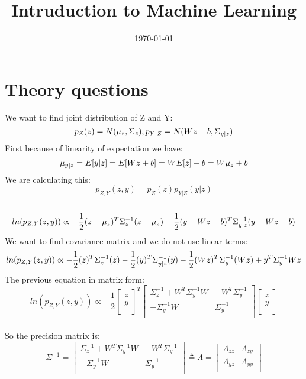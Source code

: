 \documentclass[12pt]{article}
\title{Intruduction to Machine Learning}
\date{\today}
\begin{document}
\maketitlepage
\maketitlestart
\section{Theory questions}
\begin{qsolve}[Question 1]
	We want to find joint distribution of Z and Y:\\
	$$p_Z(z)=N(\mu_z,\Sigma_z),p_{Y|Z}=N(Wz+b,\Sigma_{y|z})\\$$
	First because of linearity of expectation we have:\\
	$$\mu_{y|z}=E[y|z]=E[Wz+b]=WE[z]+b=W\mu_z+b\\$$
	We are calculating this:\\
	$$p_{Z,Y}(z,y)=p_Z(z)p_{Y|Z}(y|z)$$\\
	$$ln(p_{Z,Y}(z,y))\propto-\frac{1}{2}(z-\mu_z)^T\Sigma_z^{-1}(z-\mu_z)-\frac{1}{2}(y-Wz-b)^T\Sigma_{y|z}^{-1}(y-Wz-b)\\$$
	We want to find covariance matrix and we do not use linear terms:\\
	$$ln(p_{Z,Y}(z,y))\propto-\frac{1}{2}(z)^T\Sigma_z^{-1}(z)-\frac{1}{2}(y)^T\Sigma_{y|z}^{-1}(y)-\frac{1}{2}(Wz)^T\Sigma_y^{-1}(Wz)+y^T\Sigma_y^{-1}Wz\\$$
	The previous equation in matrix form:\\
	$$ln(p_{Z,Y}(z,y))\propto-\frac{1}{2} \begin{bmatrix} z  \\y \\\end{bmatrix}^T\begin{bmatrix} \Sigma_z^{-1}+W^T\Sigma_y^{-1}W & -W^T\Sigma_y^{-1} \\-\Sigma_y^{-1}W & \Sigma_y^{-1} \\\end{bmatrix} \begin{bmatrix} z  \\y \\\end{bmatrix}$$\\
	So the precision matrix is:\\
	$$\Sigma^{-1}=\begin{bmatrix} \Sigma_z^{-1}+W^T\Sigma_y^{-1}W & -W^T\Sigma_y^{-1} \\-\Sigma_y^{-1}W & \Sigma_y^{-1} \\\end{bmatrix}\triangleq\Lambda=\begin{bmatrix} \Lambda_{zz} & \Lambda_{zy}  \\\Lambda_{yz}&\Lambda_{yy} \\\end{bmatrix}$$\\

\end{qsolve}
\end{document}
